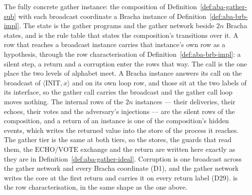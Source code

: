 \begin{definition}
  \label{def:aba-gather-low}
  \leanok
  The fully concrete gather instance: the composition of Definition~\ref{def:aba-gather-sub} with each broadcast coordinate a Bracha instance of Definition~\ref{def:aba-brb-impl}.
  The state is the gather programs and the gather network beside $2n$ Bracha states, and  is the rule table that states the composition's transitions over it.
  A row that reaches a broadcast instance carries that instance's own row as a hypothesis, through the row characterisation of Definition~\ref{def:aba-brb-impl}: a silent step, a return and a corruption enter the rows that way.
  The call is the one place the two levels of alphabet meet.
  A Bracha instance answers its call on the broadcast of $\langle\mathrm{INIT}, x\rangle$ and on its own loop row, and those sit at the two labels of its interface, so the gather call carries the broadcast and the gather call loop moves nothing.
  The internal rows of the $2n$ instances --- their deliveries, their echoes, their votes and the adversary's injections --- are the silent rows of the composition, and a return of an instance is one of the composition's hidden events, which writes the returned value into the store of the process it reaches.
  The gather tier is the same at both tiers, so the stores, the guards that read them, the $\mathrm{ECHO}$/$\mathrm{VOTE}$ exchange and the return are written here exactly as they are in Definition~\ref{def:aba-gather-ideal}.
  Corruption is one broadcast across the gather network and every Bracha coordinate (D1), and the gather network writes the core at the first return and carries it on every return label (D29).
   is the row characterisation, in the same shape as the one above.
\end{definition}
